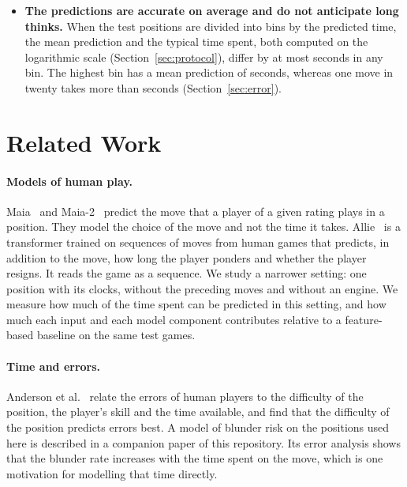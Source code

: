 \documentclass[11pt]{article}
\begin{document}
\begin{itemize}
The coefficient of determination (R\textsuperscript{2}) of the best model
is \iflook, and \% of its predictions are
within a factor of two of the time spent\fi.
\iflook
\item \textbf{The predictions are accurate on average and do not anticipate
long thinks.} When the test positions are divided into
 bins by the predicted time, the mean prediction
and the typical time spent, both computed on the logarithmic scale
(Section~\ref{sec:protocol}), differ by at most
 seconds in any bin. The highest bin has a
mean prediction of
 seconds, whereas one move in twenty takes
more than  seconds (Section~\ref{sec:error}).
\fi
\end{itemize}

\section{Related Work}
\label{sec:related}

\paragraph{Models of human play.}
Maia~\cite{maia} and Maia-2~\cite{maia2} predict the move that a player of a
given rating plays in a position. They model the choice of the move and not
the time it takes. Allie~\cite{allie} is a transformer trained on sequences
of moves from human games that predicts, in addition to the move, how long
the player ponders and whether the player resigns. It reads the game as a
sequence. We study a narrower setting: one position with its clocks, without
the preceding moves and without an engine. We measure how much of the time
spent can be predicted in this setting, and how much each input and each
model component contributes relative to a feature-based baseline on the same
test games.

\paragraph{Time and errors.}
Anderson et al.~\cite{humanerror} relate the errors of human players to the
difficulty of the position, the player's skill and the time available, and
find that the difficulty of the position predicts errors best. A model of
blunder risk on the positions used here is described in a companion paper of
this repository. Its error analysis shows that the blunder rate increases
with the time spent on the move, which is one motivation for modelling that
time directly.
\end{document}
